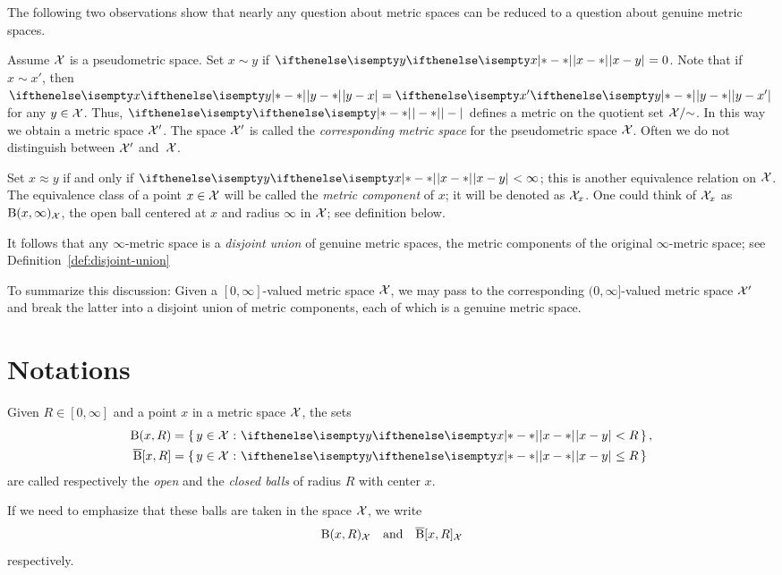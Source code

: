 The following two observations show that
nearly any question about metric spaces can be reduced to a question about genuine metric spaces.

Assume $\mathcal{X}$ is a pseudometric space.
Set
$x\sim y$ if $\dist{x}{y}{}=0$. 
Note that if $x\sim x'$, then $\dist{y}{x}{}=\dist{y}{x'}{}$ for any $y\in\spc{X}$.
Thus, $\dist{}{}{}$ defines a metric on the
quotient set $\mathcal{X}/{\sim}$.
In this way we obtain a metric space $\mathcal{X}'$.
The space $\mathcal{X}'$ is called the 
\emph{corresponding metric space} for the pseudometric space $\mathcal{X}$.
Often we do not distinguish between $\mathcal{X}'$ and~$\mathcal{X}$. 


Set $x\approx y$ if and only if $\dist{x}{y}{}<\infty$;
this is another equivalence relation on $\mathcal{X}$.
The equivalence class of a point $x\in\spc{X}$ will be called the \emph{metric component} 
 of $x$; it will be denoted as $\mathcal{X}_x$.
One could think of $\mathcal{X}_x$ as  $\mathrm{B}{}(x,\infty)_{\mathcal{X}}$, the open ball centered at $x$ and radius $\infty$ in $\mathcal{X}$; see definition below.

It follows that any $\infty$-metric space is a \emph{disjoint union} of genuine metric spaces, the metric components of the original $\infty$-metric space; see Definition~\ref{def:disjoint-union}

To summarize this discussion: Given a $[0,\infty]$-valued metric space $\mathcal{X}$, we may pass to the corresponding $(0,\infty]$-valued metric space $\mathcal{X}'$ and break the latter  into a disjoint union of metric components, each of which is  a genuine metric space.


\section{Notations}

Given $R\in[0,\infty]$ and a point $x$ in a metric space $\mathcal{X}$, the sets
\begin{align*}
\oBall(x,R)&=\set{y\in \spc{X}}{\dist{x}{y}{}<R},
\\
\cBall[x,R]&=\set{y\in \spc{X}}{ \dist{x}{y}{}\le R}
\end{align*}
are called respectively the  \emph{open} and  the \emph{closed  balls}   of radius $R$ with center $x$.

If we need to emphasize that these balls are taken in the space $\mathcal{X}$,
we write 
\[\mathrm{B}{}(x,R)_{\mathcal{X}}\quad\text{and}\quad \overline{\mathrm{B}}{}[x,R]_{\mathcal{X}}\]
respectively.

